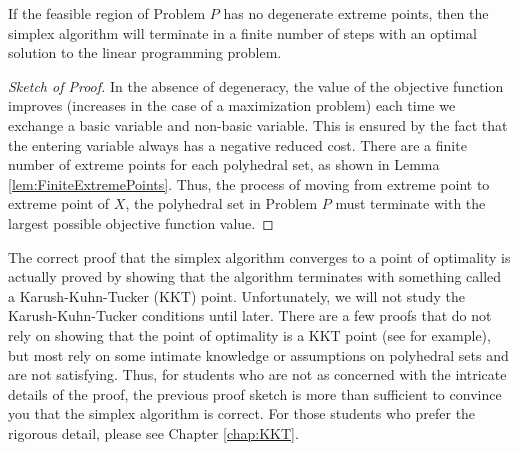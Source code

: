 \begin{theorem} If the feasible region of Problem $P$ has no degenerate extreme points, then the simplex algorithm will terminate in a finite number of steps with an optimal solution to the linear programming problem. 
\label{thm:SimpleConvergence}
\end{theorem}
\begin{proof}[Sketch of Proof] In the absence of degeneracy, the value of the objective function improves (increases in the case of a maximization problem) each time we exchange a basic variable and non-basic variable. This is ensured by the fact that the entering variable always has a negative reduced cost. There are a finite number of extreme points for each polyhedral set, as shown in Lemma \ref{lem:FiniteExtremePoints}. Thus, the process of moving from extreme point to extreme point of $X$, the polyhedral set in Problem $P$ must terminate with the largest possible objective function value. 
\end{proof}

\begin{remark} The correct proof that the simplex algorithm converges to a point of optimality is actually proved by showing that the algorithm terminates with something called a Karush-Kuhn-Tucker (KKT) point. Unfortunately, we will not study the Karush-Kuhn-Tucker conditions until later. There are a few proofs that do not rely on showing that the point of optimality is a KKT point (see \cite{Dan60} for example), but most rely on some intimate knowledge or assumptions on polyhedral sets and are not satisfying. Thus, for students who are not as concerned with the intricate details of the proof, the previous proof sketch is more than sufficient to convince you that the simplex algorithm is correct. For those students who prefer the rigorous detail, please see Chapter \ref{chap:KKT}.
\end{remark}

